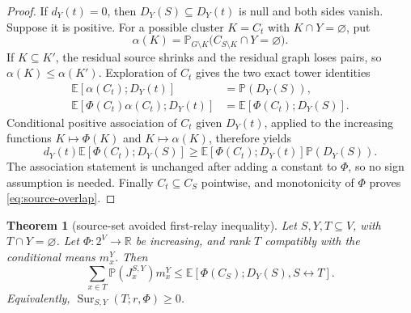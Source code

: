 \documentclass[11pt]{article}
\newtheorem{theorem}{Theorem}[section]
\theoremstyle{definition}
\theoremstyle{remark}
\newcommand{\PP}{\mathbb P}
\newcommand{\EE}{\mathbb E}
\newcommand{\Sur}{\operatorname{Sur}}
\newcommand{\con}{\leftrightarrow}
\begin{document}
\begin{proof}
If $d_Y(t)=0$, then $D_Y(S)\subseteq D_Y(t)$ is null and both sides
vanish.  Suppose it is positive.  For a possible cluster $K=C_t$ with
$K\cap Y=\varnothing$, put
\[
 \alpha(K)=\PP_{G\setminus K}
  \bigl(C_{S\setminus K}\cap Y=\varnothing\bigr).
\]
If $K\subseteq K'$, the residual source shrinks and the residual graph
loses pairs, so $\alpha(K)\leq\alpha(K')$.  Exploration of $C_t$ gives
the two exact tower identities
\begin{align*}
 \EE[\alpha(C_t);D_Y(t)]&=\PP(D_Y(S)),\\
 \EE[\Phi(C_t)\alpha(C_t);D_Y(t)]
   &=\EE[\Phi(C_t);D_Y(S)].
\end{align*}
Conditional positive association of $C_t$ given $D_Y(t)$, applied to
the increasing functions $K\mapsto\Phi(K)$ and $K\mapsto\alpha(K)$,
therefore yields
\[
 d_Y(t)\EE[\Phi(C_t);D_Y(S)]
 \geq
 \EE[\Phi(C_t);D_Y(t)]\PP(D_Y(S)).
\]
The association statement is unchanged after adding a constant to
$\Phi$, so no sign assumption is needed.  Finally
$C_t\subseteq C_S$ pointwise, and monotonicity of $\Phi$ proves
\eqref{eq:source-overlap}.
\end{proof}

\begin{theorem}[source-set avoided first-relay inequality]\label{thm:SAG}
Let $S,Y,T\subseteq V$, with $T\cap Y=\varnothing$.  Let $\Phi:2^V\to
\mathbb R$ be increasing, and rank $T$ compatibly with the conditional
means $m_x^Y$.  Then
\begin{equation}\label{eq:SAG}
 \boxed{\quad
 \sum_{x\in T}\PP(J_x^{S,Y})m_x^Y
 \leq
 \EE[\Phi(C_S);D_Y(S),S\con T].
 \quad}
\end{equation}
Equivalently, $\Sur_{S,Y}(T;r,\Phi)\geq0$.
\end{theorem}
\end{document}
